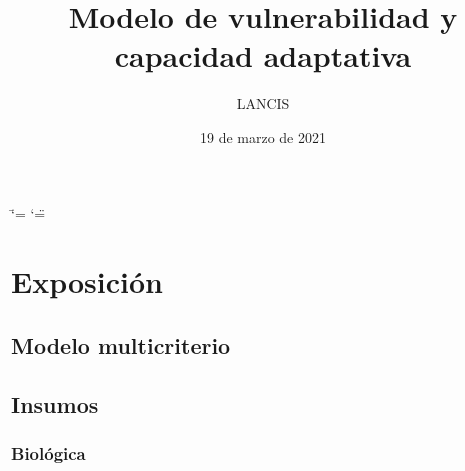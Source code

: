 \documentclass[letterpaper,10pt,spanish]{sphinxmanual}
\title{Modelo de vulnerabilidad y capacidad adaptativa}
\date{19 de marzo de 2021}
\author{LANCIS}
\begin{document}
\ifdefined\shorthandoff
  \ifnum\catcode`\=\string=\active\shorthandoff{=}\fi
  \ifnum\catcode`\"=\active{}\fi
\fi

\pagestyle{empty}
\sphinxmaketitle
\pagestyle{plain}
\sphinxtableofcontents
\pagestyle{normal}
\label{\detokenize{index::doc}}



\chapter{Exposición}
\label{\detokenize{exposicion:exposicion}}\label{\detokenize{exposicion::doc}}

\section{Modelo multicriterio}
\label{\detokenize{exposicion:modelo-multicriterio}}


\section{Insumos}
\label{\detokenize{exposicion:insumos}}

\subsection{Biológica}
\label{\detokenize{exposicion:biologica}}
\end{document}
